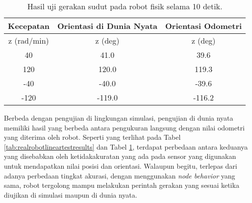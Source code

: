 \begin{table}
  \caption{Hasil uji gerakan sudut pada robot fisik selama 10 detik.}
  \label{tab:realrobotangulartestresults}
  \centering
  \begin{tabular}{c|c|c}
    \toprule
    Kecepatan   & Orientasi di Dunia Nyata  & Orientasi Odometri \\
    \midrule
    z (rad/min) & z (deg)                   & z (deg) \\
    \midrule
    40          & 41.0                      & 39.6 \\
    120         & 120.0                     & 119.3 \\
    -40         & -40.0                     & -39.6 \\
    -120        & -119.0                    & -116.2 \\
    \bottomrule
  \end{tabular}
\end{table}

Berbeda dengan pengujian di lingkungan simulasi,
  pengujian di dunia nyata memiliki hasil yang berbeda antara pengukuran langsung dengan nilai odometri yang diterima oleh robot.
Seperti yang terlihat pada Tabel \ref{tab:realrobotlineartestresults} dan Tabel \ref{tab:realrobotangulartestresults},
  terdapat perbedaan antara keduanya yang disebabkan oleh ketidakakuratan yang ada pada sensor yang digunakan untuk mendapatkan nilai posisi dan orientasi.
Walaupun begitu,
  terlepas dari adanya perbedaan tingkat akurasi, dengan menggunakan \emph{node behavior} yang sama,
  robot tergolong mampu melakukan perintah gerakan yang sesuai ketika diujikan di simulasi maupun di dunia nyata.

